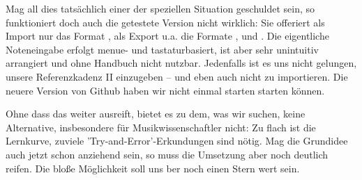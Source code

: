 Mag all dies tatsächlich einer der speziellen Situation geschuldet sein, so
funktioniert doch auch die getestete Version nicht wirklich: Sie offeriert als
Import nur das Format , als Export u.a. die Formate ,
 und . Die eigentliche Noteneingabe erfolgt menue- und
tastaturbasiert, ist aber sehr unintuitiv arrangiert und ohne Handbuch nicht
nutzbar. Jedenfalls ist es uns nicht gelungen, unsere Referenzkadenz II
einzugeben -- und eben auch nicht zu importieren. Die neuere Version von Github
haben wir nicht einmal starten starten können.

Ohne dass das  weiter ausreift, bietet es zu dem, was wir suchen,
keine Alternative, insbesondere für Musikwissenschaftler nicht: Zu flach ist die
Lernkurve, zuviele 'Try-and-Error'-Erkundungen sind nötig. Mag die Grundidee
auch jetzt schon anziehend sein, so muss die Umsetzung aber noch deutlich
reifen. Die bloße Möglichkeit soll uns ber noch einen Stern wert sein.
%

